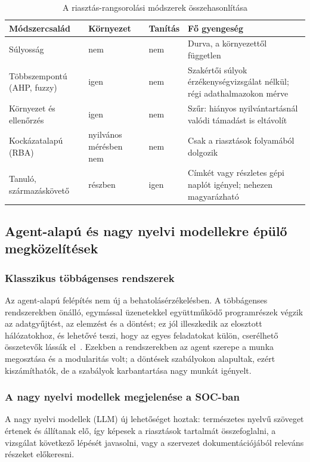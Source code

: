 \begin{table}[H]
    \centering
    \caption{A riasztás-rangsorolási módszerek összehasonlítása}
    \label{tab:rangsorolas}
    \small
    \begin{tabular}{|L{3.4cm}|L{1.9cm}|L{1.6cm}|L{5.7cm}|}
        \hline
        \textbf{Módszercsalád} & \textbf{Környe\-zet} & \textbf{Tanítás} & \textbf{Fő gyengeség} \\ \hline
        Súlyosság & nem & nem & Durva, a környezettől független \\ \hline
        Többszempontú (\ac{AHP}, fuzzy) & igen & nem & Szakértői súlyok érzékenységvizsgálat nélkül; régi adathalmazokon mérve \\ \hline
        Környezet és ellenőrzés & igen & nem & Szűr: hiányos nyilvántartásnál valódi támadást is eltávolít \\ \hline
        Kockázatalapú (\ac{RBA}) & nyilvános mérésben nem & nem & Csak a riasztások folyamából dolgozik \\ \hline
        Tanuló, származáskövető & részben & igen & Címkét vagy részletes gépi naplót igényel; nehezen magyarázható \\ \hline
    \end{tabular}
\end{table}

\subsection{Agent-alapú és nagy nyelvi modellekre épülő megközelítések}\label{sec:agentek}

\subsubsection{Klasszikus többágenses rendszerek}
Az agent-alapú felépítés nem új a behatolásérzékelésben. A többágenses rendszerekben önálló, egymással üzenetekkel együttműködő programrészek végzik az adatgyűjtést, az elemzést és a döntést; ez jól illeszkedik az elosztott hálózatokhoz, és lehetővé teszi, hogy az egyes feladatokat külön, cserélhető összetevők lássák el~\cite{bougueroua2021}. Ezekben a rendszerekben az agent szerepe a munka megosztása és a modularitás volt; a döntések szabályokon alapultak, ezért kiszámíthatók, de a szabályok karbantartása nagy munkát igényelt.

\subsubsection{A nagy nyelvi modellek megjelenése a SOC-ban}
A nagy nyelvi modellek (\ac{LLM}) új lehetőséget hoztak: természetes nyelvű szöveget értenek és állítanak elő, így képesek a riasztások tartalmát összefoglalni, a vizsgálat következő lépését javasolni, vagy a szervezet dokumentációjából releváns részeket előkeresni.

